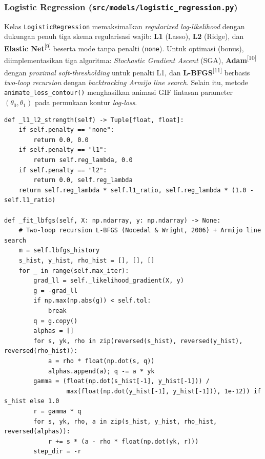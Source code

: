 \documentclass[11pt,a4paper]{article}
\numberwithin{figure}{section}
\numberwithin{table}{section}
\newcommand{\fnmark}[1]{\textsuperscript{[#1]}}
\begin{document}
\subsubsection[Logistic Regression]{Logistic Regression (\texttt{src/models/logistic\_regression.py})}

Kelas \texttt{LogisticRegression} memaksimalkan \textit{regularized log-likelihood} dengan dukungan penuh tiga skema regularisasi wajib: \textbf{L1} (Lasso), \textbf{L2} (Ridge), dan \textbf{Elastic Net}\fnmark{9} beserta mode tanpa penalti (\texttt{none}). Untuk optimasi (bonus), diimplementasikan tiga algoritma: \textit{Stochastic Gradient Ascent} (SGA), \textbf{Adam}\fnmark{10} dengan \textit{proximal soft-thresholding} untuk penalti L1, dan \textbf{L-BFGS}\fnmark{11} berbasis \textit{two-loop recursion} dengan \textit{backtracking Armijo line search}. Selain itu, metode \texttt{animate\_loss\_contour()} menghasilkan animasi GIF lintasan parameter $(\theta_0, \theta_1)$ pada permukaan kontur \textit{log-loss}.

\noindent\begin{minipage}{\linewidth}
\begin{lstlisting}
def _l1_l2_strength(self) -> Tuple[float, float]:
    if self.penalty == "none":
        return 0.0, 0.0
    if self.penalty == "l1":
        return self.reg_lambda, 0.0
    if self.penalty == "l2":
        return 0.0, self.reg_lambda
    return self.reg_lambda * self.l1_ratio, self.reg_lambda * (1.0 - self.l1_ratio)

def _fit_lbfgs(self, X: np.ndarray, y: np.ndarray) -> None:
    # Two-loop recursion L-BFGS (Nocedal & Wright, 2006) + Armijo line search
    m = self.lbfgs_history
    s_hist, y_hist, rho_hist = [], [], []
    for _ in range(self.max_iter):
        grad_ll = self._likelihood_gradient(X, y)
        g = -grad_ll
        if np.max(np.abs(g)) < self.tol:
            break
        q = g.copy()
        alphas = []
        for s, yk, rho in zip(reversed(s_hist), reversed(y_hist), reversed(rho_hist)):
            a = rho * float(np.dot(s, q))
            alphas.append(a); q -= a * yk
        gamma = (float(np.dot(s_hist[-1], y_hist[-1])) /
                 max(float(np.dot(y_hist[-1], y_hist[-1])), 1e-12)) if s_hist else 1.0
        r = gamma * q
        for s, yk, rho, a in zip(s_hist, y_hist, rho_hist, reversed(alphas)):
            r += s * (a - rho * float(np.dot(yk, r)))
        step_dir = -r
\end{lstlisting}
\end{minipage}
\end{document}
